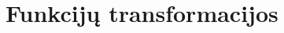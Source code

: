 \documentclass{article}
\begin{document}
\section{Funkcijų transformacijos}
\begin{comment}
\hyperlink{atgal}{
\begin{tikzpicture}
\node[rectangle, draw=black, fill=blue!10, rounded corners=.2cm] (pirmyn) {\hypertarget{pirmyn}{\textbf{GO}}};
\end{tikzpicture}}

\hyperlink{atgal}{
\begin{tikzpicture}
\node[rectangle, draw=black, fill=blue!30, rounded corners=.2cm] (vidurin) {\hypertarget{vidurin}{\textbf{GO}}};
\end{tikzpicture}}

\begin{tikzpicture}
\node[red,draw=black, rounded corners=.2cm, line width=0.8mm, fill=blue!70!yellow] (x) at (5,2) {$\colorbox{blue!70!yellow}{\text{Pyp}}$};
\end{tikzpicture}


\end{comment}
\end{document}
